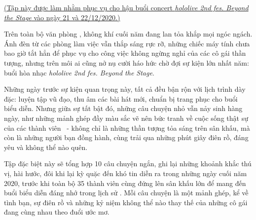 \documentclass[../main.tex]{subfiles}
\begin{document}
\vspace{80pt}


\begin{center}
  \uline{(Tập này được làm nhằm phục vụ cho hậu buổi concert \textit{hololive 2nd fes. Beyond the Stage} vào ngày 21 và 22/12/2020.)}
\end{center}

Trên toàn bộ văn phòng \hll, không khí cuối năm đang lan tỏa khắp mọi ngóc ngách. Ánh đèn từ các phòng làm việc vẫn thắp sáng rực rỡ, những chiếc máy tính chưa bao giờ tắt hẳn để phục vụ cho công việc không ngừng nghỉ của các cô gái thần tượng, nhưng trên môi ai cũng nở nụ cười háo hức chờ đợi sự kiện lớn nhất năm: buổi hòa nhạc \textit{hololive 2nd fes. Beyond the Stage}.

Những ngày trước sự kiện quan trọng này, tất cả đều bận rộn với lịch trình dày đặc: luyện tập vũ đạo, thu âm các bài hát mới, chuẩn bị trang phục cho buổi biểu diễn. Nhưng giữa sự tất bật đó, những câu chuyện nhỏ vẫn nảy sinh hàng ngày, như những mảnh ghép đầy màu sắc vẽ nên bức tranh về cuộc sống thật sự của các thành viên \hll\ - không chỉ là những thần tượng tỏa sáng trên sân khấu, mà còn là những người bạn đồng hành, cùng trải qua những phút giây điên rồ, đáng yêu và không thể nào quên.

Tập đặc biệt này sẽ tổng hợp 10 câu chuyện ngắn, ghi lại những khoảnh khắc thú vị, hài hước, đôi khi lại kỳ quặc đến khó tin diễn ra trong những ngày cuối năm 2020, trước khi toàn bộ 35 thành viên cùng đứng lên sân khấu lớn để mang đến buổi biểu diễn đáng nhớ trong lịch sử \hll. Mỗi câu chuyện là một mảnh ghép, kể về tình bạn, sự điên rồ và những kỷ niệm không thể nào thay thế của những cô gái đang cùng nhau theo đuổi ước mơ.

\vspace{-8pt}
\end{document}
